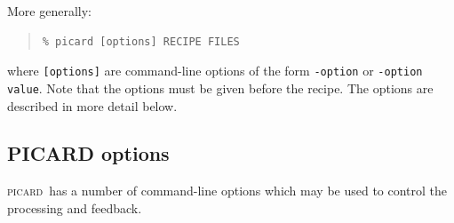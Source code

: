 \documentclass[twoside,11pt]{article}
\renewcommand{\_}{\texttt{\symbol{95}}}
\newenvironment{myquote}{\begin{quote}\begin{small}}{\end{small}\end{quote}}
\newcommand{\picard}{\textsc{picard}}
\begin{document}
More generally:
\begin{myquote}
\begin{verbatim}
% picard [options] RECIPE FILES
\end{verbatim}
\end{myquote}
where \verb+[options]+ are command-line options of the form
\verb+-option+ or \verb+-option value+.  Note that the options must be
given before the recipe. The options are described in more detail
below.

\subsection{PICARD options}

\picard\ has a number of command-line options which may be used to
control the processing and feedback.
\end{document}
